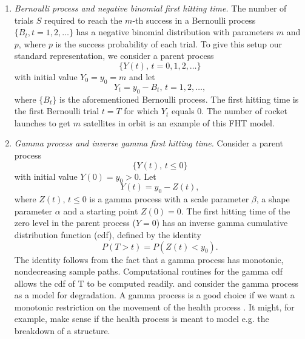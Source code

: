 \begin{enumerate}
    \item
        \textit{Bernoulli process and negative binomial first hitting time.}
        The number of trials $S$ required to reach the $m$-th success in a Bernoulli process $\{B_t,t=1,2,\ldots\}$ has a negative binomial distribution with parameters $m$ and $p$, where $p$ is the success probability of each trial. To give this setup our standard representation, we consider a parent process
        \begin{equation*}
            \{Y(t),\,t=0,1,2,\ldots\}
        \end{equation*}
        with initial value $Y_0=y_0=m$ and let
        \begin{equation*}
            Y_t=y_0-B_t,\,t=1,2,\ldots,
        \end{equation*}
        where $\{B_t\}$ is the aforementioned Bernoulli process. The first hitting time is the first Bernoulli trial $t=T$ for which $Y_t$ equals 0. The number of rocket launches to get $m$ satellites in orbit is an example of this FHT model.
    \item
        \textit{Gamma process and inverse gamma first hitting time.}
        Consider a parent process
        \begin{equation*}
            \{Y(t),\,t\leq0\}
        \end{equation*}
        with initial value $Y(0)=y_0>0$. Let
        \begin{equation*}
            Y(t)=y_0-Z(t),
        \end{equation*}
        where $Z(t),\,t\leq0$ is a gamma process with a scale parameter $\beta$, a shape parameter $\alpha$ and a starting point $Z(0)=0$. The first hitting time of the zero level in the parent process ($Y=0$) has an inverse gamma cumulative distribution function (cdf), defined by the identity
        \begin{equation*}
            P(T>t)=P(Z(t)<y_0).
        \end{equation*}
        The identity follows from the fact that a gamma process has monotonic, nondecreasing sample paths.
        Computational routines for the gamma cdf allows the cdf of T to be computed readily.
        \citet{singpurwalla1995} and \citet{lawless2004} consider the gamma process as a model for degradation.
        A gamma process is a good choice if we want a monotonic restriction on the movement of the health process \citep{leewhitmore2006}. 
        It might, for example, make sense if the health process is meant to model e.g. the breakdown of a structure.

\end{enumerate}

